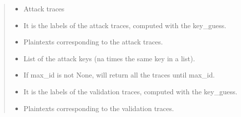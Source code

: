 \documentclass[letterpaper,10pt,english]{sphinxmanual}
\begin{document}
\begin{fulllineitems}
\begin{fulllineitems}
\begin{quote}
\begin{description}
\sphinxAtStartPar
\begin{itemize}
\item {} 
\sphinxAtStartPar
{} \textendash{} Attack traces

\item {} 
\sphinxAtStartPar
{} \textendash{} It is the labels of the attack traces, computed with the key\_guess.

\item {} 
\sphinxAtStartPar
{} \textendash{} Plaintexts corresponding to the attack traces.

\item {} 
\sphinxAtStartPar
{} \textendash{} List of the attack keys (na times the same key in a list).

\item {} 
\sphinxAtStartPar
{} \textendash{} If max\_id is not None, will return all the traces until max\_id.

\item {} 
\sphinxAtStartPar
{} \textendash{} It is the labels of the validation traces, computed with the key\_guess.

\item {} 
\sphinxAtStartPar
{} \textendash{} Plaintexts corresponding to the validation traces.

\end{itemize}


\end{description}\end{quote}

\end{fulllineitems}


\begin{fulllineitems}
\label{\detokenize{MLSCAlib.Data:MLSCAlib.Data.data_manager.DataManager.set_device}}
\pysigstartsignatures
{}
\pysigstopsignatures
\end{fulllineitems}


\end{fulllineitems}
\end{document}
